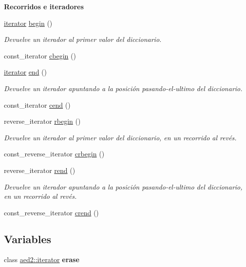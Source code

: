 \begin{Indent}\textbf{ Recorridos e iteradores}\par
\begin{DoxyCompactItemize}
\item 
\hyperlink{classaed2_1_1iterator}{iterator} \hyperlink{namespaceaed2_a669d2fcf59e6ec1fe40105ba395768b6}{begin} ()
\begin{DoxyCompactList}\small\item\em Devuelve un iterador al primer valor del diccionario. \end{DoxyCompactList}\item 
const\+\_\+iterator \hyperlink{namespaceaed2_ac1c803de21070eb6f9b7fa3e2035bc22}{cbegin} ()
\item 
\hyperlink{classaed2_1_1iterator}{iterator} \hyperlink{namespaceaed2_a3a9c18730be5c97fa5eafebd3aef61ed}{end} ()
\begin{DoxyCompactList}\small\item\em Devuelve un iterador apuntando a la posición pasando-\/el-\/ultimo del diccionario. \end{DoxyCompactList}\item 
const\+\_\+iterator \hyperlink{namespaceaed2_a82f5c60a3ebe119105e244fff3c90e20}{cend} ()
\item 
reverse\+\_\+iterator \hyperlink{namespaceaed2_a19713cdc443ce739325238c50f233717}{rbegin} ()
\begin{DoxyCompactList}\small\item\em Devuelve un iterador al primer valor del diccionario, en un recorrido al revés. \end{DoxyCompactList}\item 
const\+\_\+reverse\+\_\+iterator \hyperlink{namespaceaed2_a38b3285f169e2a78a3b561b5fee6027f}{crbegin} ()
\item 
reverse\+\_\+iterator \hyperlink{namespaceaed2_a161376ee8d17855224ab722ff9e0dd9a}{rend} ()
\begin{DoxyCompactList}\small\item\em Devuelve un iterador apuntando a la posición pasando-\/el-\/ultimo del diccionario, en un recorrido al revés. \end{DoxyCompactList}\item 
const\+\_\+reverse\+\_\+iterator \hyperlink{namespaceaed2_a3f4649ed2b93f1fdb07419fa1de0bf7f}{crend} ()
\end{DoxyCompactItemize}
\end{Indent}
\subsection*{Variables}
\begin{DoxyCompactItemize}
\item 
\mbox{\label{namespaceaed2_ad4e768819128d9a5e85ad658ef19e766}} 
class \hyperlink{classaed2_1_1iterator}{aed2\+::iterator} {\bfseries erase}
\end{DoxyCompactItemize}


